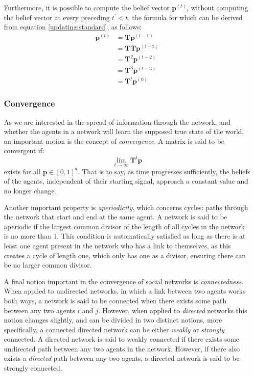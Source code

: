 \documentclass{article}
\newcommand{\T}{\textbf{T}}
\begin{document}
Furthermore, it is possible to compute the belief vector $\textbf{p}^{(t)}$, without computing the belief vector at every preceding $t^\prime < t$, the formula for which can be derived from equation \ref{updating:standard}, as follows:
\begin{align*}
    \textbf{p}^{(t)} &= \T\textbf{p}^{(t-1)} \\
    &= \T\T\textbf{p}^{(t-2)}\\
    &= \T^2\textbf{p}^{(t-2)}\\
    &= \T^3\textbf{p}^{(t-3)} \\
    &= \T^{t}\textbf{p}^{(0)}
\end{align*}

\newpage

\subsubsection{Convergence}
\label{convergence}
As we are interested in the spread of information through the network, and whether the agents in a network will learn the supposed true state of the world, an important notion is the concept of \emph{convergence}. A matrix  is said to be convergent if:
\begin{equation*}
    \lim_{t\to\infty} \T^t\textbf{p}
\end{equation*}
exists for all $\textbf{p} \in [0, 1]^n$. That is to say, as time progresses sufficiently, the beliefs of the agents, independent of their starting signal, approach a constant value and no longer change.

Another important property is \emph{aperiodicity}, which concerns cycles: paths through the network that start and end at the same agent. A network is said to be aperiodic if the largest common divisor of the length of all cycles in the network is no more than 1. This condition is automatically satisfied as long as there is at least one agent present in the network who has a link to themselves, as this creates a cycle of length one, which only has one as a divisor, ensuring there can be no larger common divisor.

A final notion important in the convergence of social networks is \emph{connectedness}. When applied to undirected networks, in which a link between two agents works both ways, a network is said to be connected when there exists some path between any two agents $i$ and $j$. However, when applied to \emph{directed} networks this notion changes slightly, and can be divided in two distinct notions, more specifically, a connected directed network can be either \emph{weakly} or \emph{strongly} connected. A directed network is said to weakly connected if there exists some undirected path between any two agents in the network. However, if there also exists a \emph{directed} path between any two agents, a directed network is said to be strongly connected.
\end{document}
